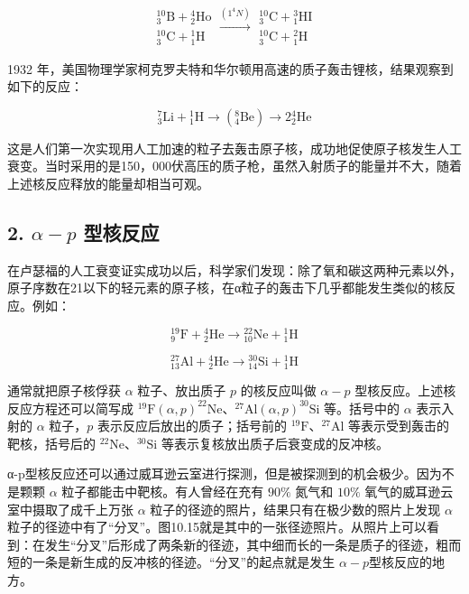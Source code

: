 \[
\begin{array}{l} { } _ { 3 } ^ { 10 } \mathrm{B} + { } _ { 2 } ^ { 4 } \mathrm{Ho} \\ { } _ { 3 } ^ { 10 } \mathrm{C} + { } _ { 1 } ^ { 1 } \mathrm{H} \end{array} \xrightarrow { ( 1 ^ { 4 } N ) } \begin{array}{l} { } _ { 3 } ^ { 10 } \mathrm{C} + { } _ { 1 } ^ { 3 } \mathrm{HI} \\ { } _ { 3 } ^ { 10 } \mathrm{C} + { } _ { 1 } ^ { 2 } \mathrm{H} \end{array}
\]

1932
年，美国物理学家柯克罗夫特和华尔顿用高速的质子轰击锂核，结果观察到如下的反应：

\[
{ } _ {3}^{7}\mathrm{Li}+{ } _ {1}^{1}\mathrm{H}\longrightarrow ( { } _ {4}^{8}\mathrm{Be})\longrightarrow 2 { } _ {2}^{4}\mathrm{He}
\]

这是人们第一次实现用人工加速的粒子去轰击原子核，成功地促使原子核发生人工衰变。当时采用的是150，000伏高压的质子枪，虽然入射质子的能量并不大，随着上述核反应释放的能量却相当可观。

\subsection{\texorpdfstring{2. \(\alpha - p\)
型核反应}{2. \textbackslash alpha - p 型核反应}}\label{alpha---p-ux578bux6838ux53cdux5e94}

在卢瑟福的人工衰变证实成功以后，科学家们发现：除了氧和碳这两种元素以外，原子序数在21以下的轻元素的原子核，在α粒子的轰击下几乎都能发生类似的核反应。例如：

\[
{ } _ {9}^{19}\mathrm{F}+{ } _ {2}^{4}\mathrm{He}\longrightarrow { } _ {10}^{22}\mathrm{Ne}+{ } _ {1}^{1}\mathrm{H}
\]

\[
{ } _ {13}^{27}\mathrm{Al}+{ } _ {2}^{4}\mathrm{He}\longrightarrow { } _ {14}^{30}\mathrm{Si}+{ } _ {1}^{1}\mathrm{H}
\]

通常就把原子核俘获 \(\alpha\) 粒子、放出质子 \(p\) 的核反应叫做
\(\alpha - p\) 型核反应。上述核反应方程还可以简写成
\(^{19}\mathrm{F}(\alpha,p)^{22}\mathrm{Ne}\)、\(^{27}\mathrm{Al}(\alpha, p)^{30}\mathrm{Si}\)
等。括号中的 \(\alpha\) 表示入射的 \(\alpha\) 粒子，\(p\)
表示反应后放出的质子；括号前的 \(^{19}\mathrm{F}\)、\(^{27}\mathrm{Al}\)
等表示受到轰击的靶核，括号后的
\(^{22}\mathrm{Ne}\)、\(^{30}\mathrm{Si}\)
等表示复核放出质子后衰变成的反冲核。

α-p型核反应还可以通过威耳逊云室进行探测，但是被探测到的机会极少。因为不是颗颗
\(\alpha\) 粒子都能击中靶核。有人曾经在充有 \(90\%\) 氮气和 \(10\%\)
氧气的威耳逊云室中摄取了成千上万张 \(\alpha\)
粒子的径迹的照片，结果只有在极少数的照片上发现 \(\alpha\)
粒子的径迹中有了``分叉''。图10.15就是其中的一张径迹照片。从照片上可以看到：在发生``分叉''后形成了两条新的径迹，其中细而长的一条是质子的径迹，粗而短的一条是新生成的反冲核的径迹。``分叉''的起点就是发生
\(\alpha - p\)型核反应的地方。


